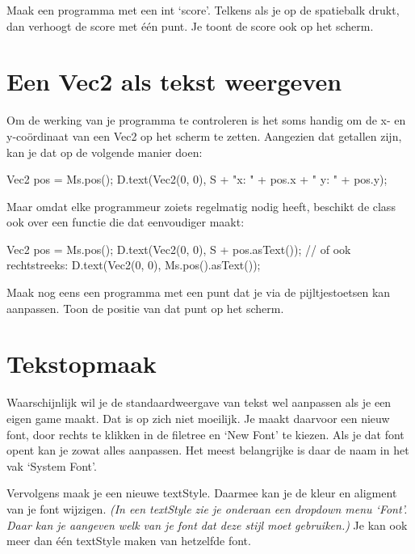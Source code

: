 \begin{exercise}
Maak een programma met een int `score'. Telkens als je op de spatiebalk drukt, dan verhoogt de score met \'e\'en punt. Je toont de score ook op het scherm.
\end{exercise}

\section{Een Vec2 als tekst weergeven}
Om de werking van je programma te controleren is het soms handig om de x- en y-co\"ordinaat van een Vec2 op het scherm te zetten. Aangezien dat getallen zijn, kan je dat op de volgende manier doen:

\begin{code}
Vec2 pos = Ms.pos();
D.text(Vec2(0, 0), S + "x: " + pos.x + " y: " + pos.y);
\end{code}

Maar omdat elke programmeur zoiets regelmatig nodig heeft, beschikt de class  ook over een functie die dat eenvoudiger maakt:

\begin{code}
Vec2 pos = Ms.pos();
D.text(Vec2(0, 0), S + pos.asText());
// of ook rechtstreeks:
D.text(Vec2(0, 0), Ms.pos().asText());
\end{code}

\begin{exercise}
Maak nog eens een programma met een punt dat je via de pijltjestoetsen kan aanpassen. Toon de positie van dat punt op het scherm.
\end{exercise}

\section{Tekstopmaak}
\label{chapter:tekstopmaak}
Waarschijnlijk wil je de standaardweergave van tekst wel aanpassen als je een eigen game maakt. Dat is op zich niet moeilijk. Je maakt daarvoor een nieuw font, door rechts te klikken in de filetree en `New Font' te kiezen. Als je dat font opent kan je zowat alles aanpassen. Het meest belangrijke is daar de naam in het vak `System Font'.

Vervolgens maak je een nieuwe textStyle. Daarmee kan je de kleur en aligment van je font wijzigen. \textsl{(In een textStyle zie je onderaan een dropdown menu `Font'. Daar kan je aangeven welk van je font dat deze stijl moet gebruiken.)} Je kan ook meer dan \'e\'en textStyle maken van hetzelfde font.

